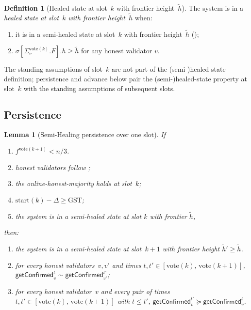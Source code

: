 \documentclass{article}
\newcommand{\start}{\ensuremath{\mathrm{start}}}
\newcommand{\vote}{\ensuremath{\mathrm{vote}}}
\newcommand{\GST}{\ensuremath{\mathrm{GST}}\xspace}
\newcommand{\comm}[1]{\ensuremath{\widetilde{#1}}}
\newcommand{\getConfirmed}{\textsf{getConfirmed}\xspace}
\theoremstyle{plain}
\newtheorem{lemma}{Lemma}
\theoremstyle{definition}
\newtheorem{definition}{Definition}
\theoremstyle{remark}
\begin{document}
\begin{definition}[Healed state at slot~$k$ with frontier height~$\comm{h}$]\label{def:healed}
The system is in a \emph{healed state at slot~$k$ with frontier height~$\comm{h}$} when:
\begin{enumerate}
  \item it is in a semi-healed state at slot~$k$ with frontier height~$\comm{h}$ ();
  \item\label{rev:def:healed-state:F-cap} $\sigma[\Sigma_v^{\vote(k)}.F].h \geq \comm{h}$ for any honest validator $v$.
\end{enumerate}
\end{definition}

The standing assumptions of slot~$k$ are not part of the (semi-)healed-state definition; persistence and advance below pair the (semi-)healed-state property at slot~$k$ with the standing assumptions of subsequent slots.

\subsection{Persistence}\label{sec:healing-persistence}
\begin{lemma}[Semi-Healing persistence over one slot]\label{lem:semi-healing-persistence}
If
\begin{enumerate}
  \item $f^{\vote(k+1)}<n/3$.
  \item honest validators follow ;
  \item the online-honest-majority holds at slot~$k$;
  \item $\start(k) - \Delta \geq \GST$;
  \item the system is in a semi-healed state at slot $k$ with frontier $\comm{h}$,
\end{enumerate}
then:
\begin{enumerate}
  \item the system is in a semi-healed state at slot~$k+1$ with frontier height $\comm{h}' \geq \comm{h}$.
  \item for every honest validators~$v,v'$ and times $t, t' \in [\vote(k),\, \vote(k+1)]$, $\getConfirmed_v^{t} \sim \getConfirmed_{v'}^{t'}$;
  \item for every honest validator~$v$ and every pair of times $t, t' \in [\vote(k),\, \vote(k+1)]$ with $t \leq t'$, $\getConfirmed_v^{t'} \succeq \getConfirmed_v^t$.
\end{enumerate}
\end{lemma}
\end{document}
